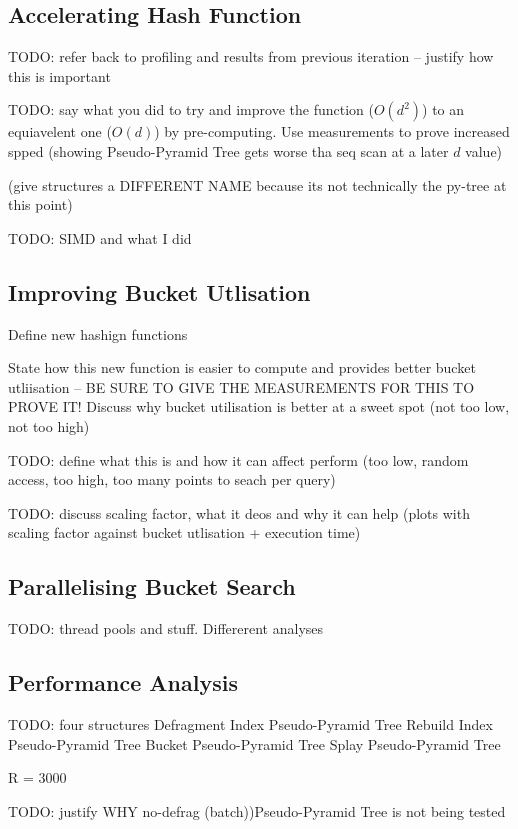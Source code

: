 \subsection{Accelerating Hash Function}

TODO: refer back to profiling and results from previous iteration -- justify how this is important

TODO: say what you did to try and improve the function ($O(d^2)$) to an equiavelent one ($O(d)$) by pre-computing. Use measurements to prove increased spped (showing Pseudo-Pyramid Tree gets worse tha seq scan at a later $d$ value)

 (give structures a DIFFERENT NAME because its not technically the py-tree at this point)

TODO: SIMD and what I did

\subsection{Improving Bucket Utlisation}

Define new hashign functions

 State how this new function is easier to compute and provides better bucket utliisation -- BE SURE TO GIVE THE MEASUREMENTS FOR THIS TO PROVE IT! Discuss why bucket utilisation is better at a sweet spot (not too low, not too high)

TODO: define what this is and how it can affect perform (too low, random access, too high, too many points to seach per query)

TODO: discuss scaling factor, what it deos and why it can help (plots with scaling factor against bucket utlisation + execution time)

\subsection{Parallelising Bucket Search}

TODO: thread pools and stuff. Differerent analyses

\subsection{Performance Analysis}

TODO: four structures
	Defragment Index Pseudo-Pyramid Tree
	Rebuild Index Pseudo-Pyramid Tree
	Bucket Pseudo-Pyramid Tree
	Splay Pseudo-Pyramid Tree

	R = 3000

TODO: justify WHY no-defrag (batch))Pseudo-Pyramid Tree is not being tested

